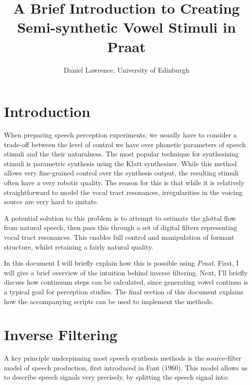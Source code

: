 \documentclass{article}\usepackage[]{graphicx}\usepackage[]{color}
\begin{document}
\linespread{1.5}
  \title{A Brief Introduction to Creating Semi-synthetic Vowel Stimuli in Praat}
\author{Daniel Lawrence, University of Edinburgh}
\date{}
\maketitle
\section*{Introduction}
When preparing speech perception experiments, we usually have to consider a trade-off between the level of control we have over phonetic parameters of speech stimuli and the their naturalness. The most popular technique for synthesizing stimuli is parametric synthesis using the Klatt synthesizer. While this method allows very fine-grained control over the synthesis output, the resulting stimuli often have a very robotic quality. The reason for this is that while it is relatively straightforward to model the vocal tract resonances, irregularities in the voicing source are very hard to imitate.

A potential solution to this problem is to attempt to estimate the glottal flow from natural speech, then pass this through a set of digital filters representing vocal tract resonances. This enables full control and manipulation of formant structure, whilst retaining a fairly natural quality.

In this document I will briefly explain how this is possible using \textit{Praat}. First, I will give a brief overview of the intuition behind inverse filtering. Next, I'll briefly discuss how continuum steps can be calculated, since generating vowel continua is a typical goal for perception studies. The final section of this document explains how the accompanying scripts can be used to implement the methods.
\newpage
\section*{Inverse Filtering}
A key principle underpinning most speech synthesis methods is the source-filter model of speech production, first introduced in Fant (1960). This model allows us to describe speech signals very precisely, by splitting the speech signal into:
\end{document}
